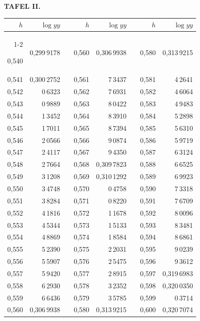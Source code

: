 \endgroup
\clearpage
{}
\begingroup
\centering
\fontsize{9}{9}\selectfont
\setlength{\tabcolsep}{8pt}
\renewcommand{\arraystretch}{1}
\setlength{\parskip}{0pt}
\textbf{TAFEL II.}
\par\vspace{7pt}
\begin{tabular}{|r|r|@{}p{9pt}@{}|r|r|@{}p{9pt}@{}|r|r|}
\hline
\rule{0pt}{8.5pt}\(h\) & \(\log yy\) & & \(h\) & \(\log yy\) & & \(h\) & \(\log yy\) \\
\cline{1-2}\cline{4-5}\cline{7-8}
\rule{0pt}{8.5pt}0,540 & 0,299\,9178 &  & 0,560 & 0,306\,9938 &  & 0,580 & 0,313\,9215 \\
0,541 & 0,300\,2752 &  & 0,561 & 7\,3437 &  & 0,581 & 4\,2641 \\
0,542 & 0\,6323 &  & 0,562 & 7\,6931 &  & 0,582 & 4\,6064 \\
0,543 & 0\,9889 &  & 0,563 & 8\,0422 &  & 0,583 & 4\,9483 \\
0,544 & 1\,3452 &  & 0,564 & 8\,3910 &  & 0,584 & 5\,2898 \\
0,545 & 1\,7011 &  & 0,565 & 8\,7394 &  & 0,585 & 5\,6310 \\[3pt]
0,546 & 2\,0566 &  & 0,566 & 9\,0874 &  & 0,586 & 5\,9719 \\
0,547 & 2\,4117 &  & 0,567 & 9\,4350 &  & 0,587 & 6\,3124 \\
0,548 & 2\,7664 &  & 0,568 & 0,309\,7823 &  & 0,588 & 6\,6525 \\
0,549 & 3\,1208 &  & 0,569 & 0,310\,1292 &  & 0,589 & 6\,9923 \\
0,550 & 3\,4748 &  & 0,570 & 0\,4758 &  & 0,590 & 7\,3318 \\[3pt]
0,551 & 3\,8284 &  & 0,571 & 0\,8220 &  & 0,591 & 7\,6709 \\
0,552 & 4\,1816 &  & 0,572 & 1\,1678 &  & 0,592 & 8\,0096 \\
0,553 & 4\,5344 &  & 0,573 & 1\,5133 &  & 0,593 & 8\,3481 \\
0,554 & 4\,8869 &  & 0,574 & 1\,8584 &  & 0,594 & 8\,6861 \\
0,555 & 5\,2390 &  & 0,575 & 2\,2031 &  & 0,595 & 9\,0239 \\[3pt]
0,556 & 5\,5907 &  & 0,576 & 2\,5475 &  & 0,596 & 9\,3612 \\
0,557 & 5\,9420 &  & 0,577 & 2\,8915 &  & 0,597 & 0,319\,6983 \\
0,558 & 6\,2930 &  & 0,578 & 3\,2352 &  & 0,598 & 0,320\,0350 \\
0,559 & 6\,6436 &  & 0,579 & 3\,5785 &  & 0,599 & 0\,3714\rlap{\hspace{.36em}\raisebox{.85ex}{.}} \\
0,560 & 0,306\,9938 &  & 0,580 & 0,313\,9215 &  & 0,600 & 0,320\,7074 \\
\hline
\end{tabular}\par
\endgroup
